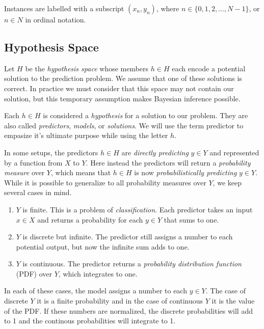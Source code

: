 \documentclass[twoside]{article}
\begin{document}
Instances are labelled with a subscript \((x_n, y_n)\), where \(n \in \{0, 1, 2,\ldots,N-1\}\), or \(n \in N\) in ordinal notation.

\subsection{Hypothesis Space}

Let \(H\) be the \textit{hypothesis space} whose members \(h \in H\) each encode a potential solution to the prediction problem. We assume that one of these solutions is correct. In practice we must consider that this space may not contain our solution, but this temporary assumption makes Bayesian inference possible.

Each \(h \in H\) is considered a \textit{hypothesis} for a solution to our problem. They are also called \textit{predictors}, \textit{models}, or \textit{solutions}. We will use the term predictor to empasize it's ultimate purpose while using the letter \(h\).

In some setups, the predictors \(h \in H\) are \textit{directly predicting} \(y \in Y\) and represented by a function from \(X\) to \(Y\). Here instead the predictors will return a \textit{probability measure} over \(Y\), which means that \(h \in H\) is now \textit{probabilistically predicting} \(y \in Y\). While it is possible to generalize to all probability measures over \(Y\), we keep several cases in mind.

\begin{enumerate}
	\item \(Y\) is finite. This is a problem of \textit{classification}. Each predictor takes an input \(x \in X\) and returns a probability for each \(y \in Y\) that sums to one.
	\item \(Y\) is discrete but infinite. The predictor still assigns a number to each potential output, but now the infinite sum adds to one.
	\item \(Y\) is continuous. The predictor returns a \textit{probability distribution function} (PDF) over \(Y\), which integrates to one.
\end{enumerate}

In each of these cases, the model assigns a number to each \(y \in Y\). The case of discrete \(Y\) it is a finite probability and in the case of continuous \(Y\) it is the value of the PDF. If these numbers are normalized, the discrete probabilities will add to 1 and the continous probabilities will integrate to 1.
\end{document}
